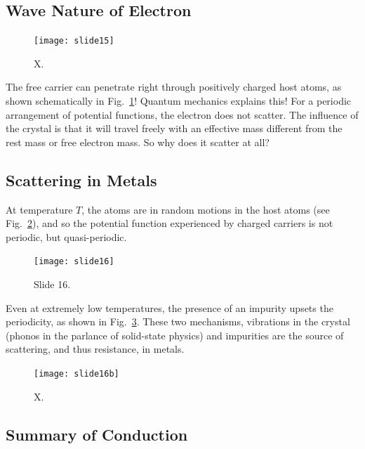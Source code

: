 \subsection{Wave Nature of Electron}

\begin{figure}
\begin{center}
\texttt{[image: slide15]}
\end{center}
\caption{X. } \label{fig:slide15}
\end{figure}

  
The free carrier can penetrate right through positively charged host atoms, as shown schematically in Fig.~\ref{fig:slide15}!  Quantum mechanics explains this!  For a periodic arrangement of potential functions, the electron does not scatter. The influence of the crystal is that it will travel freely with an effective mass different from the rest mass or free electron mass.   So why does it scatter at all?
 

\subsection{Scattering in Metals}

At temperature $T$, the atoms are in random motions in the host atoms (see Fig.~\ref{fig:slide16}), and so the potential function experienced by charged carriers is not periodic, but quasi-periodic.  

\begin{figure}
\begin{center}
\texttt{[image: slide16]}
\end{center}
\caption{Slide 16. } \label{fig:slide16}
\end{figure}

Even at extremely low temperatures, the presence of an impurity upsets the periodicity, as shown in Fig.~\ref{fig:slide16b}.  These two mechanisms, vibrations in the crystal (phonos in the parlance of solid-state physics) and impurities are the source of scattering, and thus resistance, in metals.


\begin{figure}
\begin{center}
\texttt{[image: slide16b]}
\end{center}
\caption{X. } \label{fig:slide16b}
\end{figure}

 

\subsection{Summary of Conduction}

